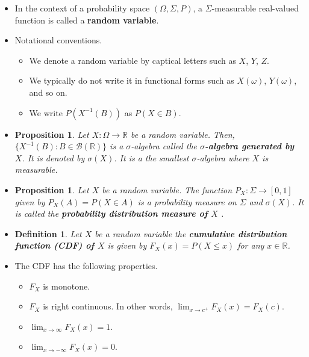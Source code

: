 \documentclass[10pt]{article}
\newtheorem{definition}[lemma]{Definition}
\newtheorem{proposition}[lemma]{Proposition}
\newcommand{\mcal}[1]{\mathcal{#1}}
\newcommand{\Real}{\mathbb{R}}
\begin{document}
\begin{itemize}
  \item In the context of a probability space $(\Omega, \Sigma, P)$, a $\Sigma$-measurable real-valued function is called a {\bf random variable}.
  
  \item Notational conventions.
  \begin{itemize}
    \item We denote a random variable by captical letters such as $X$, $Y$, $Z$. 
    \item We typically do not write it in functional forms such as $X(\omega)$, $Y(\omega)$, and so on. 
    \item We write $P(X^{-1}(B))$ as $P(X \in B)$.
  \end{itemize}
  
  \item \begin{proposition}
    Let $X: \Omega \rightarrow \Real$ be a random variable. Then, $\{ X^{-1}(B) : B \in \mcal{B}(\Real )\}$ is a $\sigma$-algebra called the {\bf $\sigma$-algebra generated by $X$}. It is denoted by $\sigma(X)$. It is a the smallest $\sigma$-algebra where $X$ is measurable.
  \end{proposition}

  \item \begin{proposition}
    Let $X$ be a random variable. The function $P_X: \Sigma \rightarrow [0,1]$ given by $P_X(A) = P(X \in A)$ is a probability measure on $\Sigma$ and $\sigma(X)$. It is called the {\bf probability distribution measure of $X$} .
  \end{proposition}

  \item \begin{definition}
    Let $X$ be a random variable the {\bf cumulative distribution function (CDF) of $X$} is given by $F_X(x) = P(X \leq x)$ for any $x \in \Real$.
  \end{definition}

  \item The CDF has the following properties.
  \begin{itemize}
    \item $F_X$ is monotone.
    \item $F_X$ is right continuous. In other words, $\lim_{x \rightarrow c^+} F_X(x) = F_X(c)$.
    \item $\lim_{x \rightarrow \infty} F_X(x) = 1$.
    \item $\lim_{x \rightarrow -\infty} F_X(x) = 0$.
  \end{itemize}  


\end{itemize}
\end{document}
